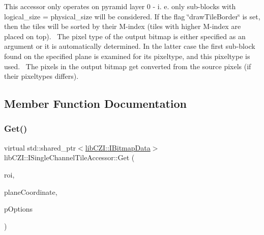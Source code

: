 This accessor only operates on pyramid layer 0 -\/ i. e. only sub-\/blocks with logical\+\_\+size = physical\+\_\+size will be considered. If the flag \char`\"{}draw\+Tile\+Border\char`\"{} is set, then the tiles will be sorted by their M-\/index (tiles with higher M-\/index are placed \textquotesingle{}on top\textquotesingle{}).~\newline
The pixel type of the output bitmap is either specified as an argument or it is automatically determined. In the latter case the first sub-\/block found on the specified plane is examined for its pixeltype, and this pixeltype is used.~\newline
The pixels in the output bitmap get converted from the source pixels (if their pixeltypes differs). 

\subsection{Member Function Documentation}
\mbox{\label{classlib_c_z_i_1_1_i_single_channel_tile_accessor_a50e17c0c197bf5f782a67e044dd4e943}} 
\subsubsection{\texorpdfstring{Get()}{Get()}\hspace{0.1cm}{\footnotesize\ttfamily [1/5]}}
{\footnotesize\ttfamily virtual std\+::shared\+\_\+ptr$<$\hyperlink{classlib_c_z_i_1_1_i_bitmap_data}{lib\+C\+Z\+I\+::\+I\+Bitmap\+Data}$>$ lib\+C\+Z\+I\+::\+I\+Single\+Channel\+Tile\+Accessor\+::\+Get (\begin{DoxyParamCaption}\item[{const \hyperlink{structlib_c_z_i_1_1_int_rect}{lib\+C\+Z\+I\+::\+Int\+Rect} \&}]{roi,  }\item[{const \hyperlink{classlib_c_z_i_1_1_i_dim_coordinate}{I\+Dim\+Coordinate} $\ast$}]{plane\+Coordinate,  }\item[{const \hyperlink{structlib_c_z_i_1_1_i_single_channel_tile_accessor_1_1_options}{Options} $\ast$}]{p\+Options }\end{DoxyParamCaption})\hspace{0.3cm}{\ttfamily [pure virtual]}}



